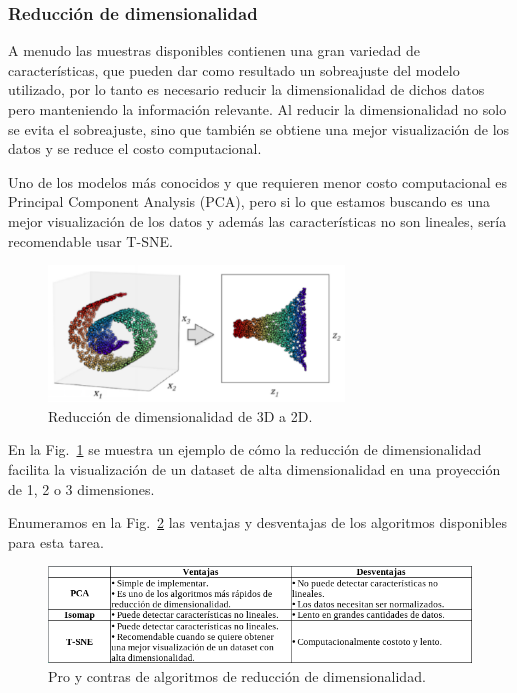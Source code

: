 \documentclass[a4paper,12pt]{article}
\begin{document}
\subsubsection{Reducción de dimensionalidad }

A menudo las muestras disponibles contienen una gran variedad de características, que pueden dar como resultado un sobreajuste del modelo utilizado, por lo tanto es necesario reducir la dimensionalidad de dichos datos pero manteniendo la información relevante. Al reducir la dimensionalidad no solo se evita el sobreajuste, sino que también se obtiene una mejor visualización de los datos y se reduce el costo computacional. 

Uno de los modelos más conocidos y que requieren menor costo computacional es Principal Component Analysis (PCA), pero si lo que estamos buscando es una mejor visualización de los datos y además las características no son lineales, sería recomendable usar T-SNE. 

\begin{figure}[H]
	\begin{center}				
	\includegraphics[width=0.7\textwidth]{tesis_12.png}
  	\caption{Reducción de dimensionalidad de 3D a 2D.}
  	\label{fig:reduxdimension.}
  	\end{center}
\end{figure}

En la Fig.~\ref{fig:reduxdimension.} \cite{trejoml} se muestra un ejemplo de cómo la reducción de dimensionalidad facilita la visualización de un dataset de alta dimensionalidad en una proyección de 1, 2 o 3 dimensiones.

Enumeramos en la Fig.~\ref{fig:proconsreduxdim.} las ventajas y desventajas de los algoritmos disponibles para esta tarea.

\begin{figure}[H]
	\begin{center}				
	\includegraphics[width=1\textwidth]{tesis_15.png}
  	\caption{Pro y contras de algoritmos de reducción de dimensionalidad.}
  	\label{fig:proconsreduxdim.}
  	\end{center}
\end{figure}
\end{document}
